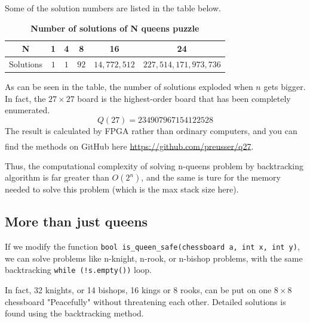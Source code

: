\documentclass[cn,black,12pt,normal]{elegantnote}
\newcommand{\uct}[1]{\textsuperscript{\textsuperscript{\cite{#1}}}}
\begin{document}
Some of the solution numbers are listed in the table below.
\begin{table}[H]
    \caption{\textbf{Number of solutions of N queens puzzle}}
    \centering
    \begin{tabular}{c|ccccc}
        \toprule
        N         & 1   & 4   & 8    & 16          & 24                   \\
        \midrule
        Solutions & $1$ & $1$ & $92$ & $14,772,512$ & $227,514,171,973,736$ \\
        \bottomrule
    \end{tabular}
\end{table}

As can be seen in the table, the number of solutions exploded when $n$ gets bigger. In fact, the $27 \times 27$ board is the highest-order board that has been completely enumerated.
\begin{equation}
    Q(27) = 234907967154122528
\end{equation}
The result is calculated by FPGA rather than ordinary computers, and you can find the methods on GitHub here \url{https://github.com/preusser/q27}.\uct{preusser2017putting}

Thus, the computational complexity of solving n-queens problem by backtracking algorithm is far greater than $O(2^n)$, and the same is ture for the memory needed to solve this problem (which is the max stack size here).

\subsection{More than just queens}

If we modify the function \lstinline{bool is_queen_safe(chessboard a, int x, int y)}, we can solve problems like n-knight, n-rook, or n-bishop problems, with the same backtracking \lstinline{while (!s.empty())} loop.

In fact, 32 knights, or 14 bishops, 16 kings or 8 rooks, can be put on one $8 \times 8$ chessboard "Peacefully" without threatening each other. Detailed solutions is found using the backtracking method.


\end{document}
